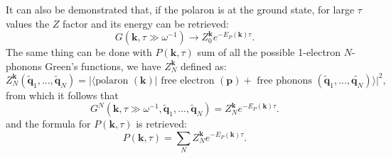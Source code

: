 It can also be demonstrated that, if the polaron is at the ground state, for large $\tau$ values the $Z$ factor and its energy can 
be retrieved:
\begin{equation}
    G(\mathbf{k},\tau\gg \omega^{-1})\xrightarrow{}Z_0^\mathbf{k}e^{-E_P(\mathbf{k})\tau}.
\end{equation}
The same thing can be done with $P(\mathbf{k},\tau)$ sum of all the possible 1-electron $N$-phonons Green's functions, 
we have $Z_N^\mathbf{k}$ defined as:
\begin{equation}
    Z_N^\mathbf{k}(\tilde{\mathbf{q}}_1,...,\tilde{\mathbf{q}}_N)=|\langle \text{polaron }(\mathbf{k})|\text{ free electron }(\mathbf{p})+\text{ free phonons }(\tilde{\mathbf{q}}_1,...,\tilde{\mathbf{q}_N})\rangle|^2,
\end{equation}
from which it follows that
\begin{equation}
    G^N(\mathbf{k},\tau\gg\omega^{-1},\tilde{\mathbf{q}}_1,...,\tilde{\mathbf{q}}_N)=Z_N^\mathbf{k}e^{-E_P(\mathbf{k})\tau}.
\end{equation}
and the formula for $P(\mathbf{k},\tau)$ is retrieved:
\begin{equation}
    P(\mathbf{k},\tau)=\sum_{N}Z_N^\mathbf{k}e^{-E_P(\mathbf{k})\tau}.
\end{equation}
